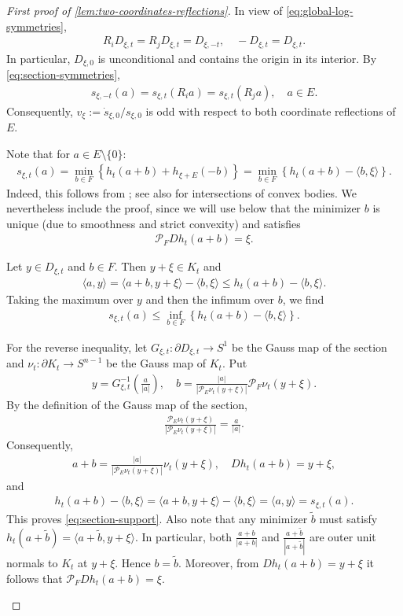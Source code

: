 \documentclass[12pt]{amsart}
\newcommand{\Sn}{S^{n-1}}
\newcommand{\ip}[2]{\langle #1,#2\rangle}
\newcommand{\eq}[1]{\begin{equation}\begin{alignedat}{2}#1\end{alignedat}\end{equation}}
\theoremstyle{plain}
\theoremstyle{definition}
\theoremstyle{remark}
\numberwithin{equation}{section}
\begin{document}
\begin{proof}[First proof of \autoref{lem:two-coordinates-reflections}]
In view of \eqref{eq:global-log-symmetries},
\eq{\label{eq:section-symmetries}
 R_iD_{\xi,t}=R_jD_{\xi,t}=D_{\xi,-t},\quad -D_{\xi,t}=D_{\xi,t}.
}
In particular, $D_{\xi,0}$ is unconditional and contains the origin in its interior. By \eqref{eq:section-symmetries},
\eq{
 s_{\xi,-t}(a)=s_{\xi,t}(R_i a)=s_{\xi,t}(R_j a),\quad a\in E.
}
Consequently, $v_{\xi}:=\dot{s}_{\xi,0}/s_{\xi,0}$ is odd with respect to both coordinate reflections of $E$.

Note that for $a\in E\setminus\{0\}$:
\eq{\label{eq:section-support}
 s_{\xi,t}(a)=\min_{b\in F}\left\{h_t(a+b)+h_{\xi+E}(-b)\right\}=\min_{b\in F}\left\{h_t(a+b)-\ip{b}{\xi}\right\}.
}
Indeed, this follows from \cite[Thm. 5.6]{Roc70}; see also \cite[Sec. 1.7, Notes, item 3, p. 59]{Sch14} for intersections of convex bodies. We nevertheless include the proof, since we will use below that the minimizer $b$ is unique (due to smoothness and strict convexity) and satisfies
\eq{
 \mathcal{P}_{F}Dh_t(a+b)=\xi.
}

Let $y\in D_{\xi,t}$ and $b\in F$. Then $y+\xi\in K_t$ and
\eq{
 \ip{a}{y}=\ip{a+b}{y+\xi}-\ip{b}{\xi}\leq h_t(a+b)-\ip{b}{\xi}.
}
Taking the maximum over $y$ and then the infimum over $b$, we find
\eq{
 s_{\xi,t}(a)\leq
 \inf_{b\in F}\left\{h_t(a+b)-\ip{b}{\xi}\right\}.
}

For the reverse inequality, let $G_{\xi,t}:\partial D_{\xi,t}\to S^1$ be the Gauss map of the section and $\nu_t:\partial K_t\to\Sn$ be the Gauss map of $K_t$. Put
\eq{
 y=G_{\xi,t}^{-1}\left(\frac{a}{|a|}\right),\quad  b=\frac{|a|}{|\mathcal{P}_{E}\nu_t(y+\xi)|}\mathcal{P}_{F}\nu_t(y+\xi).
}
By the definition of the Gauss map of the section,
\eq{
 \frac{\mathcal{P}_{E}\nu_t(y+\xi)}{|\mathcal{P}_{E}\nu_t(y+\xi)|}=\frac{a}{|a|}.
}
Consequently,
\eq{
 a+b=\frac{|a|}{|\mathcal{P}_{E}\nu_t(y+\xi)|}\nu_t(y+\xi),
 \quad Dh_t(a+b)=y+\xi,
}
and
\eq{
 h_t(a+b)-\ip{b}{\xi}=\ip{a+b}{y+\xi}-\ip{b}{\xi}=\ip{a}{y}=s_{\xi,t}(a).
}
This proves \eqref{eq:section-support}. Also note that any minimizer $\tilde{b}$ must satisfy $h_t(a+\tilde{b})=\ip{a+\tilde{b}}{y+\xi}$. In particular, both $\frac{a+b}{|a+b|}$ and $\frac{a+\tilde{b}}{|a+\tilde{b}|}$ are outer unit normals to $K_t$ at $y+\xi$. Hence $b=\tilde{b}$. Moreover, from $Dh_t(a+b)=y+\xi$ it follows that $\mathcal{P}_{F}Dh_t(a+b)=\xi$.

\begin{figure}[H]
\end{figure}
\end{proof}
\end{document}
